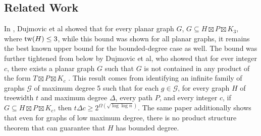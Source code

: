 \documentclass[../main.tex]{subfiles}
\begin{document}
	\subsection{Related Work}
	In \cite{DJMMUW20}, Dujmovic et al showed that for every planar graph $G$, $G\subseteq H\boxtimes P\boxtimes K_3$, where $\operatorname{tw}(H) \le 3$, while this bound was shown for all planar graphs, it remains the best known upper bound for the bounded-degree case as well. The bound was further tightened from below by Dujmovic et al, who showed that for ever integer $c$, there exists a planar graph $G$ such that $G$ is not contained in any product of the form $T\boxtimes P\boxtimes K_c$ \cite{DJMMW24}.  
	This result comes from identifying an infinite family of graphs $\mathcal{G}$ of maximum degree 5 such that for each $g\in\mathcal{G}$, for every graph $H$ of treewidth $t$ and maximum degree $\Delta$, every path $P$, and every integer $c$, if $G\subseteq H \boxtimes P\boxtimes K_c$, then $t\Delta c\ge 2^{\Omega(\sqrt{\log\log n})}$.
	The same paper additionally shows that even for graphs of low maximum degree, there is no product structure theorem that can guarantee that $H$ has bounded degree. 
	
	
	
	
\end{document}
